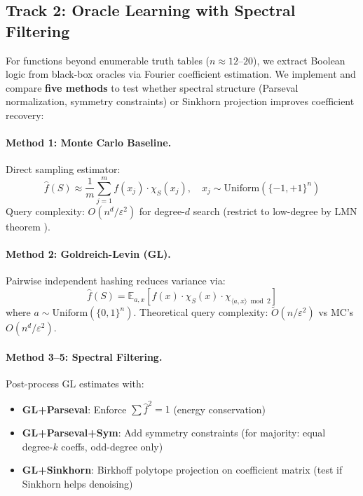 \documentclass[Royal,times,sageh]{sagej}
\begin{document}
\subsection{Track 2: Oracle Learning with Spectral Filtering}

For functions beyond enumerable truth tables ($n \approx 12$--$20$), we extract Boolean logic from black-box oracles via Fourier coefficient estimation. We implement and compare \textbf{five methods} to test whether spectral structure (Parseval normalization, symmetry constraints) or Sinkhorn projection improves coefficient recovery:

\paragraph{Method 1: Monte Carlo Baseline.} Direct sampling estimator:
\begin{equation}
    \hat{f}(S) \approx \frac{1}{m} \sum_{j=1}^m f(x_j) \cdot \chi_S(x_j), \quad x_j \sim \text{Uniform}(\{-1,+1\}^n)
\end{equation}
Query complexity: $O(n^d / \varepsilon^2)$ for degree-$d$ search (restrict to low-degree by LMN theorem \cite{linial1993constant}).

\paragraph{Method 2: Goldreich-Levin (GL).} Pairwise independent hashing \cite{goldreich1989hard} reduces variance via:
\begin{equation}
    \hat{f}(S) = \mathbb{E}_{a,x}[f(x) \cdot \chi_S(x) \cdot \chi_{\langle a, x \rangle \bmod 2}]
\end{equation}
where $a \sim \text{Uniform}(\{0,1\}^n)$. Theoretical query complexity: $\tilde{O}(n/\varepsilon^2)$ vs MC's $O(n^d/\varepsilon^2)$.

\paragraph{Method 3--5: Spectral Filtering.} Post-process GL estimates with:
\begin{itemize}
    \item \textbf{GL+Parseval}: Enforce $\sum \hat{f}^2 = 1$ (energy conservation)
    \item \textbf{GL+Parseval+Sym}: Add symmetry constraints (for majority: equal degree-$k$ coeffs, odd-degree only)
    \item \textbf{GL+Sinkhorn}: Birkhoff polytope projection on coefficient matrix (test if Sinkhorn helps denoising)
\end{itemize}
\end{document}

